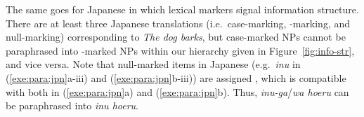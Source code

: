 


\noindent The same goes for Japanese in which lexical markers signal
information structure. There are at least three Japanese translations
(i.e.\ case-marking, \wa-marking, and null-marking) corresponding to
\textit{The dog barks}, but case-marked NPs cannot be paraphrased into
\wa-marked NPs within our  hierarchy given in
Figure~\ref{fig:info-str}, and vice versa. Note that null-marked items in
Japanese (e.g.\ \textit{inu} in (\ref{exe:para:jpn}a-iii) and
(\ref{exe:para:jpn}b-iii)) are assigned 
\citep{yatabe:99}, which is compatible with both  in
(\ref{exe:para:jpn}a) and 
(\ref{exe:para:jpn}b). Thus, \textit{inu-ga}/\textit{wa hoeru} can be
paraphrased into \textit{inu hoeru}.





